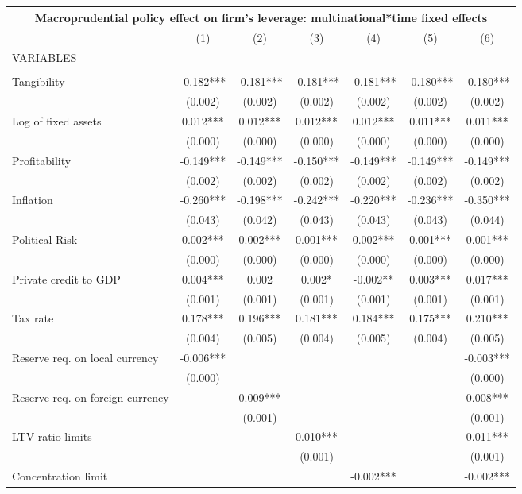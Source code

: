 \begin{tabular}{lcccccc}
\multicolumn{7}{c}{Macroprudential policy effect on firm's leverage: multinational*time fixed effects} \\ \hline
 & (1) & (2) & (3) & (4) & (5) & (6) \\
VARIABLES &  &  &  &  &  &  \\ \hline
 &  &  &  &  &  &  \\
Tangibility & -0.182*** & -0.181*** & -0.181*** & -0.181*** & -0.180*** & -0.180*** \\
 & (0.002) & (0.002) & (0.002) & (0.002) & (0.002) & (0.002) \\
Log of fixed assets & 0.012*** & 0.012*** & 0.012*** & 0.012*** & 0.011*** & 0.011*** \\
 & (0.000) & (0.000) & (0.000) & (0.000) & (0.000) & (0.000) \\
Profitability & -0.149*** & -0.149*** & -0.150*** & -0.149*** & -0.149*** & -0.149*** \\
 & (0.002) & (0.002) & (0.002) & (0.002) & (0.002) & (0.002) \\
Inflation & -0.260*** & -0.198*** & -0.242*** & -0.220*** & -0.236*** & -0.350*** \\
 & (0.043) & (0.042) & (0.043) & (0.043) & (0.043) & (0.044) \\
Political Risk & 0.002*** & 0.002*** & 0.001*** & 0.002*** & 0.001*** & 0.001*** \\
 & (0.000) & (0.000) & (0.000) & (0.000) & (0.000) & (0.000) \\
Private credit to GDP & 0.004*** & 0.002 & 0.002* & -0.002** & 0.003*** & 0.017*** \\
 & (0.001) & (0.001) & (0.001) & (0.001) & (0.001) & (0.001) \\
Tax rate & 0.178*** & 0.196*** & 0.181*** & 0.184*** & 0.175*** & 0.210*** \\
 & (0.004) & (0.005) & (0.004) & (0.005) & (0.004) & (0.005) \\
Reserve req. on local currency & -0.006*** &  &  &  &  & -0.003*** \\
 & (0.000) &  &  &  &  & (0.000) \\
Reserve req. on foreign currency &  & 0.009*** &  &  &  & 0.008*** \\
 &  & (0.001) &  &  &  & (0.001) \\
LTV ratio limits &  &  & 0.010*** &  &  & 0.011*** \\
 &  &  & (0.001) &  &  & (0.001) \\
Concentration limit &  &  &  & -0.002*** &  & -0.002*** \\

\end{tabular}

